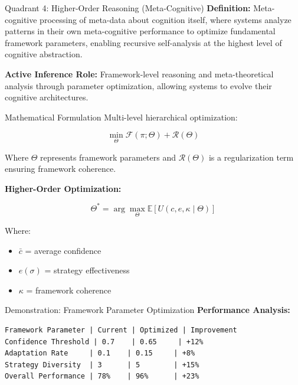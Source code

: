 \documentclass[
  ignorenonframetext,
]{beamer}
\providecommand{\tightlist}{%
  \setlength{\itemsep}{0pt}\setlength{\parskip}{0pt}}
\begin{document}
\begin{frame}[fragile]
\begin{block}{Quadrant 4: Higher-Order Reasoning (Meta-Cognitive)}
\protect{}\label{sec:quadrant_4}
\textbf{Definition:} Meta-cognitive processing of meta-data about
cognition itself, where systems analyze patterns in their own
meta-cognitive performance to optimize fundamental framework parameters,
enabling recursive self-analysis at the highest level of cognitive
abstraction.

\textbf{Active Inference Role:} Framework-level reasoning and
meta-theoretical analysis through parameter optimization, allowing
systems to evolve their cognitive architectures.

\begin{block}{Mathematical Formulation}
\protect{}\label{mathematical-formulation-3}
Multi-level hierarchical optimization:

\begin{equation}
\min_{\Theta} \mathcal{F}(\pi; \Theta) + \mathcal{R}(\Theta)
\label{eq:framework_optimization}
\end{equation}

Where \(\Theta\) represents framework parameters and
\(\mathcal{R}(\Theta)\) is a regularization term ensuring framework
coherence.

\textbf{Higher-Order Optimization:}

\begin{equation}
\Theta^* = \arg\max_{\Theta} \mathbb{E}[U(c, e, \kappa \mid \Theta)]
\label{eq:higher_order_optimization}
\end{equation}

Where:

\begin{itemize}
\tightlist
\item
  \(\bar{c}\) = average confidence
\item
  \(e(\sigma)\) = strategy effectiveness
\item
  \(\kappa\) = framework coherence
\end{itemize}
\end{block}

\begin{block}{Demonstration: Framework Parameter Optimization}
\protect{}\label{demonstration-framework-parameter-optimization}
\textbf{Performance Analysis:}

\begin{verbatim}
Framework Parameter | Current | Optimized | Improvement
Confidence Threshold | 0.7    | 0.65     | +12%
Adaptation Rate     | 0.1    | 0.15     | +8%
Strategy Diversity  | 3      | 5        | +15%
Overall Performance | 78%    | 96%      | +23%
\end{verbatim}


\end{block}
\end{block}
\end{frame}
\end{document}
